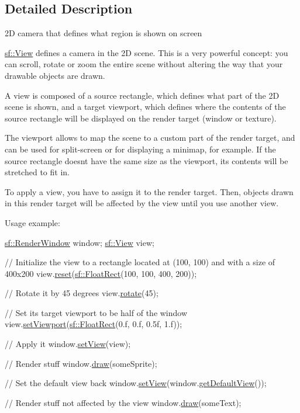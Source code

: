 \subsection{Detailed Description}
2D camera that defines what region is shown on screen 

\hyperlink{classsf_1_1_view}{sf\+::\+View} defines a camera in the 2D scene. This is a very powerful concept\+: you can scroll, rotate or zoom the entire scene without altering the way that your drawable objects are drawn.

A view is composed of a source rectangle, which defines what part of the 2D scene is shown, and a target viewport, which defines where the contents of the source rectangle will be displayed on the render target (window or texture).

The viewport allows to map the scene to a custom part of the render target, and can be used for split-\/screen or for displaying a minimap, for example. If the source rectangle doesn\textquotesingle{}t have the same size as the viewport, its contents will be stretched to fit in.

To apply a view, you have to assign it to the render target. Then, objects drawn in this render target will be affected by the view until you use another view.

Usage example\+: 
\begin{DoxyCode}
\hyperlink{classsf_1_1_render_window}{sf::RenderWindow} window;
\hyperlink{classsf_1_1_view}{sf::View} view;

\textcolor{comment}{// Initialize the view to a rectangle located at (100, 100) and with a size of 400x200}
view.\hyperlink{classsf_1_1_view_ac95b636eafab3922b7e8304fb6c00d7d}{reset}(\hyperlink{classsf_1_1_rect}{sf::FloatRect}(100, 100, 400, 200));

\textcolor{comment}{// Rotate it by 45 degrees}
view.\hyperlink{classsf_1_1_view_a5fd3901aae1845586ca40add94faa378}{rotate}(45);

\textcolor{comment}{// Set its target viewport to be half of the window}
view.\hyperlink{classsf_1_1_view_a8eaec46b7d332fe834f016d0187d4b4a}{setViewport}(\hyperlink{classsf_1_1_rect}{sf::FloatRect}(0.f, 0.f, 0.5f, 1.f));

\textcolor{comment}{// Apply it}
window.\hyperlink{classsf_1_1_render_target_a063db6dd0a14913504af30e50cb6d946}{setView}(view);

\textcolor{comment}{// Render stuff}
window.\hyperlink{classsf_1_1_render_target_a12417a3bcc245c41d957b29583556f39}{draw}(someSprite);

\textcolor{comment}{// Set the default view back}
window.\hyperlink{classsf_1_1_render_target_a063db6dd0a14913504af30e50cb6d946}{setView}(window.\hyperlink{classsf_1_1_render_target_ad3b533c3f899d7044d981ed607aef9be}{getDefaultView}());

\textcolor{comment}{// Render stuff not affected by the view}
window.\hyperlink{classsf_1_1_render_target_a12417a3bcc245c41d957b29583556f39}{draw}(someText);
\end{DoxyCode}


